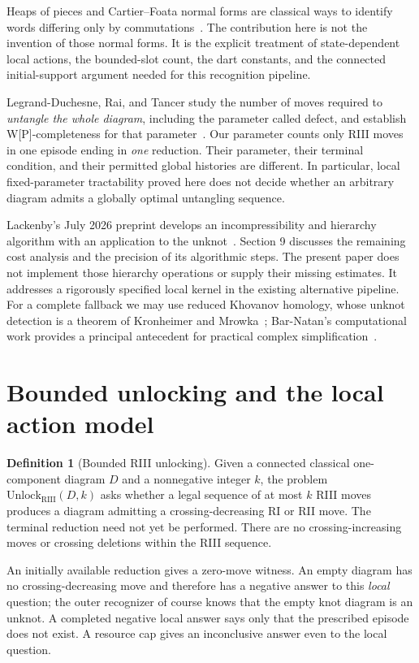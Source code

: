\documentclass[11pt]{article}
\theoremstyle{definition}
\newtheorem{definition}[theorem]{Definition}
\newcommand{\RIII}{\mathrm{RIII}}
\begin{document}
Heaps of pieces and Cartier--Foata normal forms are classical ways to identify
words differing only by commutations~\cite{viennot,krattenthaler}. The
contribution here is not the invention of those normal forms. It is the
explicit treatment of state-dependent local actions, the bounded-slot count,
the dart constants, and the connected initial-support argument needed for
this recognition pipeline.

Legrand-Duchesne, Rai, and Tancer study the number of moves required to
\emph{untangle the whole diagram}, including the parameter called defect,
and establish W[P]-completeness for that parameter~\cite{lrt}. Our parameter
counts only RIII moves in one episode ending in \emph{one} reduction. Their
parameter, their terminal condition, and their permitted global histories
are different. In particular, local fixed-parameter tractability proved here
does not decide whether an arbitrary diagram admits a globally optimal
untangling sequence.

Lackenby's July 2026 preprint develops an incompressibility and hierarchy
algorithm with an application to the unknot~\cite{lackenby}. Section 9
discusses the remaining cost analysis and the precision of its algorithmic
steps. The present paper does not implement those hierarchy operations or
supply their missing estimates. It addresses a rigorously specified local
kernel in the existing alternative pipeline. For a complete fallback we may
use reduced Khovanov homology, whose unknot detection is a theorem of
Kronheimer and Mrowka~\cite{km}; Bar-Natan's computational work provides a
principal antecedent for practical complex simplification~\cite{bn}.

\section{Bounded unlocking and the local action model}
\label{sec:model}

\begin{definition}[Bounded RIII unlocking]
Given a connected classical one-component diagram $D$ and a nonnegative
integer $k$, the problem $\mathrm{Unlock}_{\RIII}(D,k)$ asks whether a legal
sequence of at most $k$ RIII moves produces a diagram admitting a
crossing-decreasing RI or RII move. The terminal reduction need not yet be
performed. There are no crossing-increasing moves or crossing deletions
within the RIII sequence.
\end{definition}

An initially available reduction gives a zero-move witness. An empty diagram
has no crossing-decreasing move and therefore has a negative answer to this
\emph{local} question; the outer recognizer of course knows that the empty
knot diagram is an unknot. A completed negative local answer says only that
the prescribed episode does not exist. A resource cap gives an inconclusive
answer even to the local question.
\end{document}
